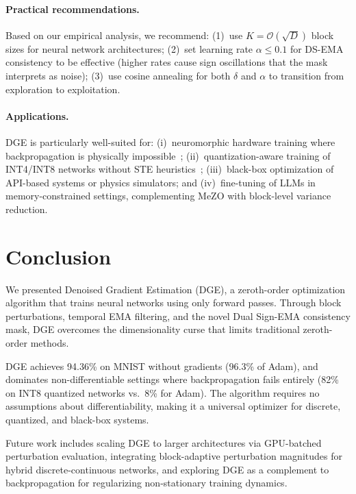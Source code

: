 \documentclass[10pt]{article}
\begin{document}
\paragraph{Practical recommendations.}
Based on our empirical analysis, we recommend: (1)~use $K = \mathcal{O}(\sqrt{D})$ block sizes for neural network architectures; (2)~set learning rate $\alpha \leq 0.1$ for DS-EMA consistency to be effective (higher rates cause sign oscillations that the mask interprets as noise); (3)~use cosine annealing for both $\delta$ and $\alpha$ to transition from exploration to exploitation.

\paragraph{Applications.}
DGE is particularly well-suited for: (i)~neuromorphic hardware training where backpropagation is physically impossible~\citep{schuman2022opportunities}; (ii)~quantization-aware training of INT4/INT8 networks without STE heuristics~\citep{banner2019post}; (iii)~black-box optimization of API-based systems or physics simulators; and (iv)~fine-tuning of LLMs in memory-constrained settings, complementing MeZO with block-level variance reduction.

\section{Conclusion}
\label{sec:conclusion}

We presented Denoised Gradient Estimation (DGE), a zeroth-order optimization algorithm that trains neural networks using only forward passes. Through block perturbations, temporal EMA filtering, and the novel Dual Sign-EMA consistency mask, DGE overcomes the dimensionality curse that limits traditional zeroth-order methods.

DGE achieves 94.36\% on MNIST without gradients (96.3\% of Adam), and dominates non-differentiable settings where backpropagation fails entirely (82\% on INT8 quantized networks vs.\ 8\% for Adam). The algorithm requires no assumptions about differentiability, making it a universal optimizer for discrete, quantized, and black-box systems.

Future work includes scaling DGE to larger architectures via GPU-batched perturbation evaluation, integrating block-adaptive perturbation magnitudes for hybrid discrete-continuous networks, and exploring DGE as a complement to backpropagation for regularizing non-stationary training dynamics.



\end{document}
